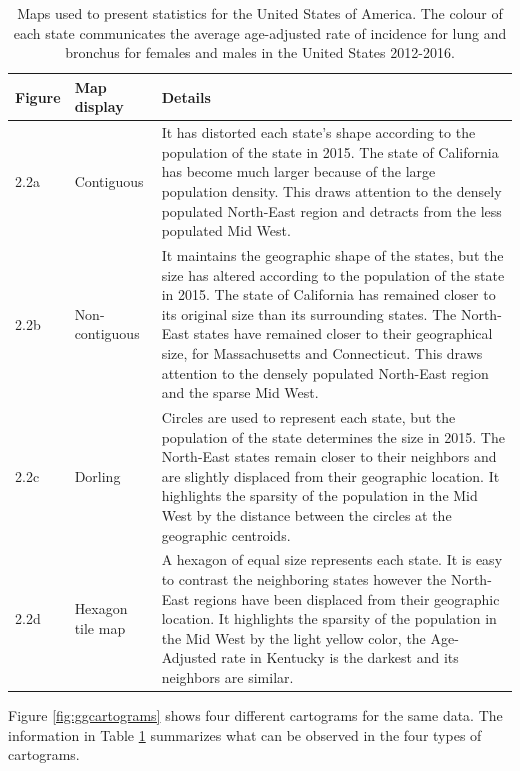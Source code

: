 \documentclass{monashthesis}
\begin{document}
\begin{table}

\caption{\label{tab:usa}Maps used to present statistics for the United States of America. The colour of each state communicates the average age-adjusted rate of incidence for lung and bronchus for females and males in the United States 2012-2016.}
\centering
\begin{tabular}[t]{ll>{\raggedright\arraybackslash}p{25em}}
\toprule
Figure & Map display & Details\\
\midrule
2.2a & Contiguous & It has distorted each state's shape according to the population of the state in 2015. The state of California has become much larger because of the large population density. This draws attention to the densely populated North-East region and detracts from the less populated Mid West.\\
\addlinespace
2.2b & Non-contiguous & It maintains the geographic shape of the states, but the size has altered according to the population of the state in 2015. The state of California has remained closer to its original size than its surrounding states. The North-East states have remained closer to their geographical size, for Massachusetts and Connecticut. This draws attention to the densely populated North-East region and the sparse Mid West.\\
\addlinespace
2.2c & Dorling & Circles are used to represent each state, but the population of the state determines the size in 2015.  The North-East states remain closer to their neighbors and are slightly displaced from their geographic location. It highlights the sparsity of the population in the Mid West by the distance between the circles at the geographic centroids.\\
\addlinespace
2.2d & Hexagon tile map & A hexagon of equal size represents each state. It is easy to contrast the neighboring states however the North-East regions have been displaced from their geographic location. It highlights the sparsity of the population in the Mid West by the light yellow color, the Age-Adjusted rate in Kentucky is the darkest and its neighbors are similar.\\
\bottomrule
\end{tabular}
\end{table}

Figure \ref{fig:ggcartograms} shows four different cartograms for the same data. The information in Table \ref{tab:usa} summarizes what can be observed in the four types of cartograms.
\end{document}
